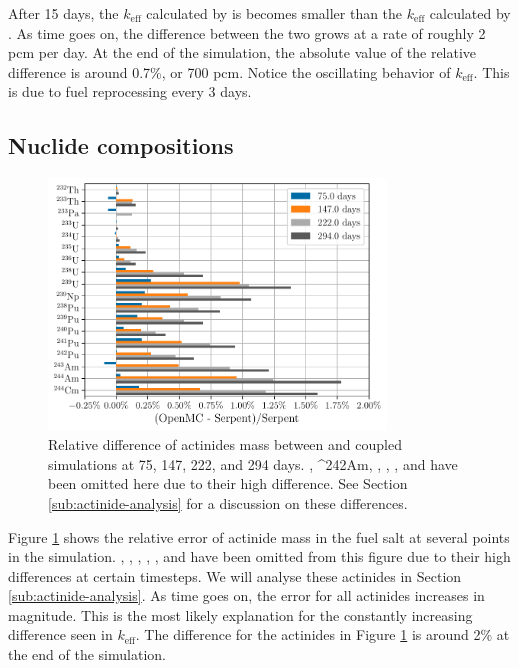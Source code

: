 After 15 days, the $k_\text{eff}$ calculated by \OpenMC is becomes smaller than
the $k_\text{eff}$ calculated by \SerpentTWO. As time goes on, the difference
between the two grows at a rate of roughly 2 pcm per day. At the end of the simulation, the absolute
value of the relative difference is around 0.7\%, or 700 pcm. Notice the
oscillating behavior of $k_\text{eff}$. This is due to fuel reprocessing every 3 days.


\subsection{Nuclide compositions}
\label{sub:nuclide-compositions}

\begin{figure}[htpb]
    \centering
    \includegraphics[width=0.8\textwidth]{figs/ch5/actinides.pdf}
    \caption[Relative difference of actinides mass in fuel at selected time steps]{Relative difference of actinides mass between \OpenMC and \SerpentTWO
    coupled simulations at 75, 147, 222, and 294 days. , \ce^{{242}Am},
    , ,
    , and  have been omitted here due to their high difference.
    See Section \ref{sub:actinide-analysis} for a discussion on these differences.}
    \label{fig:actinides}
\end{figure}

Figure \ref{fig:actinides} shows the relative error of actinide mass in the fuel
salt at several points in the simulation. , ,
, , , and  have been omitted
from this figure due to their high differences at certain timesteps. We will analyse these
actinides in Section \ref{sub:actinide-analysis}. As time goes on, the error for
all actinides increases in magnitude. This is the most likely explanation for the constantly
increasing difference seen in $k_\text{eff}$. The difference for the actinides in
Figure \ref{fig:actinides} is around 2\% at the end of the simulation.

